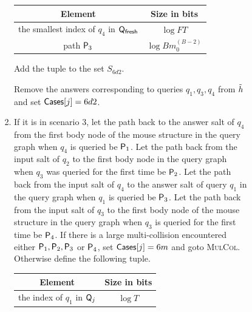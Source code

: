 \begin{enumerate}
\begin{enumerate}
\begin{itemize}
\begin{itemize}
\begin{enumerate}
\begin{center}
\begin{tabular}{|c|c|}
    Element & Size in bits \\ \hline\hline

    the smallest index  of $q_4$ in $\qf$ & $\log FT$   \\\hline
            
    path $\pth_3$ & $ \log Bm_0^{(B-2)}$\\\hline
    
    \end{tabular}
    \end{center}
   Add the tuple to the set $S_{6d2}$.
   
   Remove the answers corresponding to queries $q_1,q_3,q_4$ from $\hrest$ and set $\cs[j]=6d2$.
   \item If it is in scenario 3, let the path back to the answer salt of $q_4$ from the first body node of the mouse structure in the query graph when $q_4$ is queried be $\mathsf{P}_1$. Let the path back from the input salt of $q_2$ to the first body node in the query graph when  $q_3$ was queried for the first time be $\mathsf{P}_2$. Let the path back from the input salt of $q_4$ to the answer salt of query $q_1$ in the query graph when $q_1$ is queried be $\pth_3$. Let the path back from the input salt of $q_3$ to the first body node of the mouse structure in the query graph when $q_3$ is queried for the first time be $\mathsf{P}_4$.
    If there is a large multi-collision encountered either $\mathsf{P}_1,\mathsf{P}_2,\mathsf{P}_3$ or $\mathsf{P}_4$, set $\mathsf{Cases}[j]=6m$ and goto \textsc{MulCol}.
   Otherwise define the following tuple.
   \begin{center}
    \begin{tabular}{|c|c|}\hline

    Element & Size in bits \\ \hline\hline

    the index of $q_1$ in $\mathsf{Q}_j$ & $\log T$\\ \hline


\end{tabular}
\end{center}
\end{enumerate}
\end{itemize}
\end{itemize}
\end{enumerate}
\end{enumerate}
